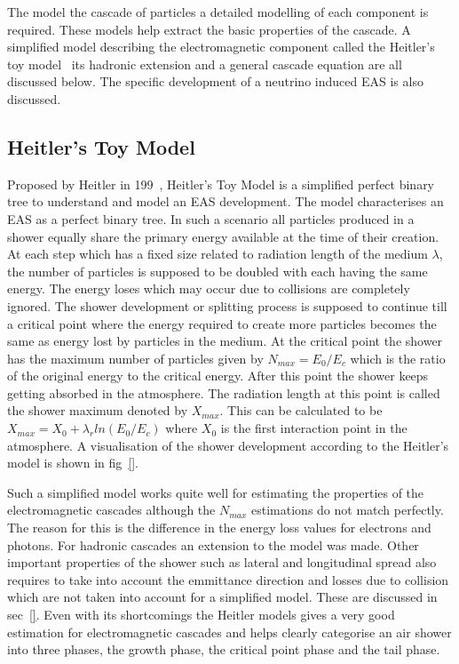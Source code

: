 The model the cascade of particles a detailed modelling of each component is required. These models help extract the basic properties of the cascade. A simplified model describing the electromagnetic component called the Heitler's toy model~\cite{} its hadronic extension and a general cascade equation are all discussed below. The specific development of a neutrino induced EAS is also discussed.  

\subsection*{Heitler's Toy Model}
\label{sec:Dev_Heitler}

Proposed by Heitler in 199~\cite{}, Heitler's Toy Model is a simplified perfect binary tree to understand and model an EAS development. The model characterises an EAS as a perfect binary tree. In such a scenario all particles produced in a shower equally share the primary energy available at the time of their creation. At each step which has a fixed size related to radiation length of the medium $\lambda$, the number of particles is supposed to be doubled with each having the same energy. The energy loses which may occur due to collisions are completely ignored. The shower development or splitting process is supposed to continue till a critical point where the energy required to create more particles becomes the same as energy lost by particles in the medium. At the critical point the shower has the maximum number of particles given by $N_{max} = E_0/E_c$ which is the ratio of the original energy to the critical energy. After this point the shower keeps getting absorbed in the atmosphere. The radiation length at this point is called the shower maximum denoted by $X_{max}$. This can be calculated to be $X_{max} = X_0 + \lambda_r ln(E_0/E_c)$ where $X_0$ is the first interaction point in the atmosphere. A visualisation of the shower development according to the Heitler's model is shown in fig~\ref{}.

Such a simplified model works quite well for estimating the properties of the electromagnetic cascades although the $N_{max}$ estimations do not match perfectly. The reason for this is the difference in the energy loss values for electrons and photons. For hadronic cascades an extension to the model was made. Other important properties of the shower such as lateral and longitudinal spread also requires to take into account the emmittance direction and losses due to collision which are not taken into account for a simplified model. These are discussed in sec~\ref{}. Even with its shortcomings the Heitler models gives a very good estimation for electromagnetic cascades and helps clearly categorise an air shower into three phases, the growth phase, the critical point phase and the tail phase. 

